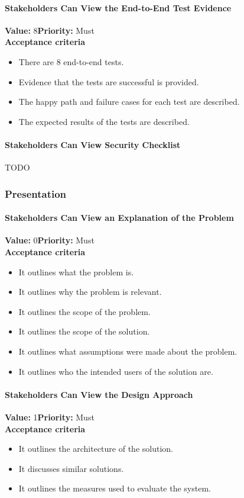 \paragraph{Stakeholders Can View the End-to-End Test Evidence}
\textbf{Value:} 8\quad \textbf{Priority:} Must\\
\textbf{Acceptance criteria}
\begin{itemize}
  \item There are 8 end-to-end tests.
  \item Evidence that the tests are successful is provided.
  \item The happy path and failure cases for each test are described.
  \item The expected results of the tests are described.
\end{itemize}

\paragraph{Stakeholders Can View Security Checklist}
TODO

\subsubsection{Presentation}

\paragraph{Stakeholders Can View an Explanation of the Problem}
\textbf{Value:} 0\quad \textbf{Priority:} Must\\
\textbf{Acceptance criteria}
\begin{itemize}
  \item It outlines what the problem is.
  \item It outlines why the problem is relevant.
  \item It outlines the scope of the problem.
  \item It outlines the scope of the solution.
  \item It outlines what assumptions were made about the problem.
  \item It outlines who the intended users of the solution are.
\end{itemize}

\paragraph{Stakeholders Can View the Design Approach}
\textbf{Value:} 1\quad \textbf{Priority:} Must\\
\textbf{Acceptance criteria}
\begin{itemize}
  \item It outlines the architecture of the solution.
  \item It discusses similar solutions.
  \item It outlines the measures used to evaluate the system.
\end{itemize}

